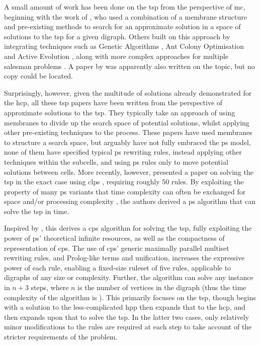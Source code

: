 A small amount of work has been done on the \gls{tsp} from the perspective of \gls{mc}, beginning with the work of \citeauthor{Nishida2006} \cite{Nishida2006}, who used a combination of a membrane structure and pre-existing methods to search for an approximate solution in a space of solutions to the \gls{tsp} for a given digraph.  Others built on this approach by integrating techniques such as Genetic Algorithms \cite{Manalastas2013,He2014}, Ant Colony Optimisation \cite{Zhang2011} and Active Evolution \cite{Song2015}, along with more complex approaches for multiple salesman problems \cite{He2015}.  A paper by \citeauthor{Chen2011} \cite{Chen2011} was apparently also written on the topic, but no copy could be located.

Surprisingly, however, given the multitude of solutions already demonstrated for the \gls{hcp}, all these \gls{tsp} papers have been written from the perspective of approximate solutions to the \gls{tsp}.  They typically take an approach of using membranes to divide up the search space of potential solutions, whilst applying other pre-existing techniques to the process.  These papers have used membranes to structure a search space, but arguably have not fully embraced the \gls{ps} model, \eg{} none of them have specified typical \gls{ps} rewriting rules, instead applying other techniques within the subcells, and using \gls{ps} rules only to move potential solutions between cells.  More recently, however, \citeauthor{Guo2017} presented a paper on solving the \gls{tsp} in the exact case using \gls{clps} \cite{Guo2017}, requiring roughly 50 rules.  By exploiting the property of many \gls{ps} variants that time complexity can often be exchanged for space and/or processing complexity \cite{Paun1999,Paun2002a,Jimenez2003,Song2017}, the authors derived a \gls{ps} algorithm that can solve the \gls{tsp} in  time.

Inspired by \cite{Guo2017}, this  derives a \gls{cps} algorithm for solving the \gls{tsp}, fully exploiting the power of \gls{ps}' theoretical infinite resources, as well as the compactness of representation of \gls{cps}.  The use of \gls{cps}' generic maximally parallel multiset rewriting rules, and Prolog-like terms and unification, increases the expressive power of each rule, enabling a fixed-size \gls{ruleset} of five rules, applicable to digraphs of any size or complexity.   Further, the algorithm can solve any instance in \(n + 3\) steps, where \(n\) is the number of vertices in the digraph (thus the time complexity of the algorithm is ).  This  primarily focuses on the \gls{tsp}, though begins with a solution to the less-complicated \gls{hpp} then expands that to the \gls{hcp}, and then expands upon that to solve the \gls{tsp}.  In the latter two cases, only relatively minor modifications to the rules are required at each step to take account of the stricter requirements of the problem.

